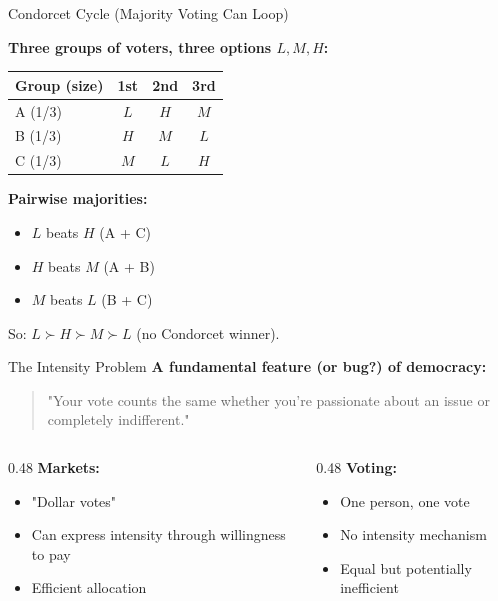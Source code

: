 \documentclass[10pt]{beamer}
\begin{document}
\begin{frame}{Condorcet Cycle (Majority Voting Can Loop)}

\textbf{Three groups of voters, three options $L, M, H$:}

\begin{center}
\small
\begin{tabular}{lccc}
\toprule
\textbf{Group (size)} & \textbf{1st} & \textbf{2nd} & \textbf{3rd} \\
\midrule
A (1/3) & $L$ & $H$ & $M$ \\
B (1/3) & $H$ & $M$ & $L$ \\
C (1/3) & $M$ & $L$ & $H$ \\
\bottomrule
\end{tabular}
\end{center}

\textbf{Pairwise majorities:}
\begin{itemize}
\item $L$ beats $H$ (A + C)
\item $H$ beats $M$ (A + B)
\item $M$ beats $L$ (B + C)
\end{itemize}

\alert{So: $L \succ H \succ M \succ L$ (no Condorcet winner).}

\end{frame}


\begin{frame}{The Intensity Problem}
\textbf{A fundamental feature (or bug?) of democracy:}


\begin{quote}
"Your vote counts the same whether you're passionate about an issue or completely indifferent."
\end{quote}



\begin{columns}
\begin{column}{0.48\textwidth}
\textbf{Markets:}
\begin{itemize}
\item "Dollar votes"
\item Can express intensity through willingness to pay
\item Efficient allocation
\end{itemize}
\end{column}


\begin{column}{0.48\textwidth}
\textbf{Voting:}
\begin{itemize}
\item One person, one vote
\item No intensity mechanism
\item Equal but potentially inefficient
\end{itemize}
\end{column}
\end{columns}

\end{frame}
\end{document}
